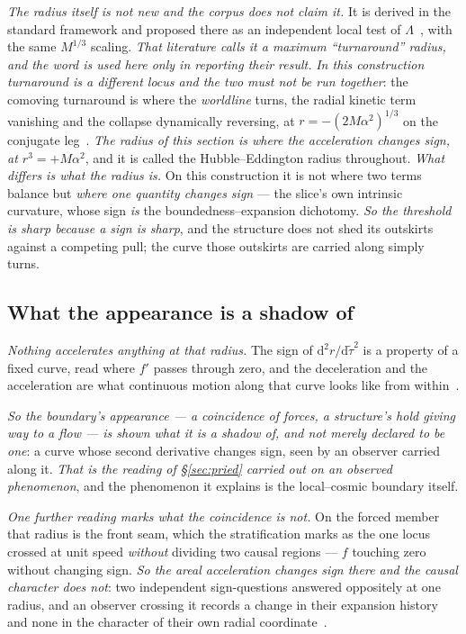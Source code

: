 \documentclass[11pt,a4paper]{article}
\newcommand{\dd}{\mathrm{d}}
\theoremstyle{plain}
\theoremstyle{definition}
\begin{document}
\emph{The radius itself is not new and the corpus does not claim it.} It is derived in the standard framework
and proposed there as an independent local test of $\Lambda$~\cite{PavlidouTomaras2014}, with the same
$M^{1/3}$ scaling. \emph{That literature calls it a maximum ``turnaround'' radius, and the word is used here
only in reporting their result.} \emph{In this construction \emph{turnaround} is a different locus and the
two must not be run together}: the comoving turnaround is where the \emph{worldline} turns, the radial kinetic
term vanishing and the collapse dynamically reversing, at $r=-(2M\alpha^{2})^{1/3}$ on the conjugate
leg~\cite{JanzenCRframework}. \emph{The radius of this section is where the \emph{acceleration} changes sign,
at $r^{3}=+M\alpha^{2}$}, and it is called the Hubble--Eddington radius throughout. \emph{What differs is what the radius
is.} On this construction it is not where two terms balance but \emph{where one quantity changes sign} --- the
slice's own intrinsic curvature, whose sign \emph{is} the boundedness--expansion dichotomy. \emph{So the
threshold is sharp because a sign is sharp}, and the structure does not shed its outskirts against a competing
pull; the curve those outskirts are carried along simply turns.

\subsection{What the appearance is a shadow of}

\emph{Nothing accelerates anything at that radius.} The sign of $\dd^{2}r/\dd\tilde\tau^{2}$ is a property of
a fixed curve, read where $f'$ passes through zero, and the deceleration and the acceleration are what
continuous motion along that curve looks like from within~\cite{JanzenShadowExistence}.

\emph{So the boundary's appearance --- a coincidence of forces, a structure's hold giving way to a flow --- is
shown what it is a shadow of, and not merely declared to be one}: a curve whose second derivative changes
sign, seen by an observer carried along it. \emph{That is the reading of \S\ref{sec:pried} carried out on an
observed phenomenon}, and the phenomenon it explains is the local--cosmic boundary itself.

\emph{One further reading marks what the coincidence is not.} On the forced member that radius is the front
seam, which the stratification marks as the one locus crossed at unit speed \emph{without} dividing two causal
regions --- $f$ touching zero without changing sign. \emph{So the areal acceleration changes sign there and
the causal character does not}: two independent sign-questions answered oppositely at one radius, and an
observer crossing it records a change in their expansion history and none in the character of their own radial
coordinate~\cite{JanzenShadowExistence}.
\end{document}
